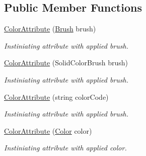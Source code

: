 \subsection*{Public Member Functions}
\begin{DoxyCompactItemize}
\item 
\mbox{\hyperlink{class_wpf_handler_1_1_u_i_1_1_color_attribute_a55398dce3088472e741cfa5682090e4f}{Color\+Attribute}} (\mbox{\hyperlink{class_wpf_handler_1_1_u_i_1_1_color_attribute_afa14c4542d8023b3ddad6aba74993877}{Brush}} brush)
\begin{DoxyCompactList}\small\item\em Instiniating attribute with applied brush. \end{DoxyCompactList}\item 
\mbox{\hyperlink{class_wpf_handler_1_1_u_i_1_1_color_attribute_a5a07f18b18eff772c26e484a764b38f3}{Color\+Attribute}} (Solid\+Color\+Brush brush)
\begin{DoxyCompactList}\small\item\em Instiniating attribute with applied brush. \end{DoxyCompactList}\item 
\mbox{\hyperlink{class_wpf_handler_1_1_u_i_1_1_color_attribute_adc45633c132e90d33ae037b138e31250}{Color\+Attribute}} (string color\+Code)
\begin{DoxyCompactList}\small\item\em Instiniating attribute with applied brush. \end{DoxyCompactList}\item 
\mbox{\hyperlink{class_wpf_handler_1_1_u_i_1_1_color_attribute_a4f6a8ef0ae7f5da318a1c18eafdfbc98}{Color\+Attribute}} (\mbox{\hyperlink{class_wpf_handler_1_1_u_i_1_1_color_attribute_a6c5c2202427bd48877142ecf85327843}{Color}} color)
\begin{DoxyCompactList}\small\item\em Instiniating attribute with applied color. \end{DoxyCompactList}\end{DoxyCompactItemize}
